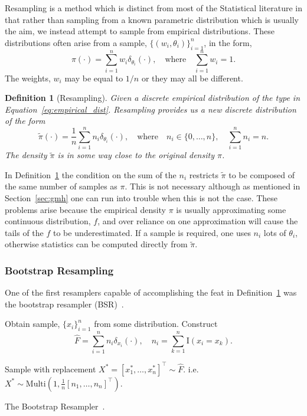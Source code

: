 \documentclass[final]{siamltex}
\newtheorem{dfn}{Definition}[section]
\begin{document}
Resampling is a method which is distinct from most of the Statistical literature in that rather than
sampling from a known parametric distribution which is usually the aim, we instead attempt to sample
from empirical distributions. These distributions often arise from a sample, $\{(w_i,
\theta_i)\}_{i=1}^n$, in the form,
\begin{equation}\label{eq:empirical_dist}
\pi(\cdot) = \sum\limits_{i=1}^n \! w_i\delta_{\theta_i}(\cdot), \quad \text{where}
\quad\sum\limits_{i=1}^n \! w_i = 1.
\end{equation}
The weights, $w_i$ may be equal to $1/n$ or they may all be different.
\begin{dfn}[Resampling]\label{def:resampling}
Given a discrete empirical distribution of the type in Equation~\eqref{eq:empirical_dist}. Resampling provides
us a new discrete distribution of the form
\[
	\tilde{\pi}(\cdot) = \frac{1}{n}\sum\limits_{i=1}^n \! n_i\delta_{\theta_i}(\cdot), \quad
		\text{where} \quad n_i \in \{0,\dots,n\}, \quad \sum\limits_{i=1}^n \! n_i = n.
\]
The density $\tilde{\pi}$ is in some way close to the original density $\pi$.
\end{dfn}
In Definition~\ref{def:resampling} the condition on the sum of the $n_i$ restricts $\tilde{\pi}$ to
be composed of the same number of samples as $\pi$. This is not necessary although as mentioned in
Section~\ref{sec:gmh} one can run into trouble when this is not the case. These problems arise
because the empirical density $\pi$ is usually approximating some continuous distribution, $f$, and
over reliance on one approximation will cause the tails of the $f$ to be underestimated. If a sample
is required, one uses $n_i$ lots of $\theta_i$, otherwise statistics can be computed directly from
$\tilde{\pi}$.


\subsubsection{Bootstrap Resampling}

One of the first resamplers capable of accomplishing the feat in Definition~\ref{def:resampling} was
the bootstrap resampler (BSR)~\cite{efron1992bootstrap}.

\begin{table}[htpb]
\begin{algorithm}[H]
\DontPrintSemicolon
\BlankLine
Obtain sample, $\{x_i\}_{i=1}^n$ from some distribution.\;
Construct
\[
	\hat{F} = \sum\limits_{i=1}^n \! n_i\delta_{x_i}(\cdot), \quad n_i = \sum\limits_{k=1}^n \!
		\text{I}(x_i = x_k).
\]

Sample with replacement $X^* = [x^*_1,\dots,x_n^*]^\top \sim \hat{F}$. i.e. $X^* \sim
\text{Multi}(1, \frac{1}{n}[n_1,\dots,n_n]^\top)$.\;
\caption{The Bootstrap Resampler~\cite{efron1992bootstrap}.\label{alg:bs_resampler}}
\end{algorithm}
\end{table}
\end{document}
